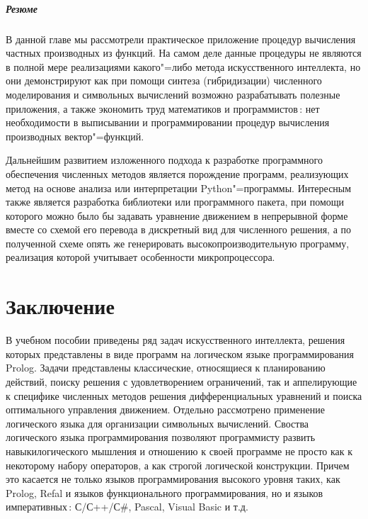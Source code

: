 \documentclass[a4paper,14pt, openany, twoside, draft]{extbook} %
\begin{document}
\paragraph{Резюме}

В данной главе мы рассмотрели практическое приложение процедур вычисления частных производных из функций.  На самом деле данные процедуры не являются в полной мере реализациями какого"=либо метода искусственного интеллекта, но они демонстрируют как при помощи синтеза (гибридизации) численного моделирования и символьных вычислений возможно разрабатывать полезные приложения, а также экономить труд математиков и программистов\,: нет необходимости в выписывании и программировании процедур вычисления производных вектор"=функций.

Дальнейшим развитием изложенного подхода к разработке программного обеспечения численных методов является порождение программ, реализующих метод на основе анализа или интерпретации Python"=программы.  Интересным также является разработка библиотеки или программного пакета, при помощи которого можно было бы задавать уравнение движением в непрерывной форме вместе со схемой его перевода в дискретный вид для численного решения, а по полученной схеме опять же генерировать высокопроизводительную программу, реализация которой учитывает особенности микропроцессора.




\chapter*{Заключение}

В учебном пособии приведены ряд задач искусственного интеллекта, решения которых представлены в виде программ на логическом языке программирования Prolog.  Задачи представлены классические, относящиеся к планированию действий, поиску решения с удовлетворением ограничений, так и аппелирующие к специфике численных методов решения дифференциальных уравнений и поиска оптимального управления движением.  Отдельно рассмотрено применение логического языка для организации символьных вычислений.  Своства логического языка программирования позволяют программисту развить навыкилогического мышления и отношению к своей программе не просто как к некоторому набору операторов, а как строгой логической конструкции.  Причем это касается не только языков программирования высокого уровня таких, как Prolog, Refal и языков функционального программирования, но и языков императивных\,: С/С++/С#, Pascal, Visual Basic и т.д.
\end{document}
